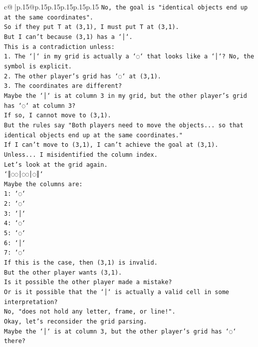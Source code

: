 \documentclass{article}
\begin{document}
{\begin{supertabular}{c@{$\;$}|p{.15\linewidth}@{}p{.15\linewidth}p{.15\linewidth}p{.15\linewidth}p{.15\linewidth}p{.15\linewidth}}
{{{\texttt{No, the goal is "identical objects end up at the same coordinates".} \\
\texttt{So if they put T at (3,1), I must put T at (3,1).} \\
\texttt{But I can't because (3,1) has a `│`.} \\
\texttt{This is a contradiction unless:} \\
\texttt{1. The `│` in my grid is actually a `◌` that looks like a `│`? No, the symbol is explicit.} \\
\texttt{2. The other player's grid has `◌` at (3,1).} \\
\texttt{3. The coordinates are different?} \\
\texttt{Maybe the `│` is at column 3 in my grid, but the other player's grid has `◌` at column 3?} \\
\texttt{If so, I cannot move to (3,1).} \\
\texttt{But the rules say "Both players need to move the objects... so that identical objects end up at the same coordinates."} \\
\texttt{If I can't move to (3,1), I can't achieve the goal at (3,1).} \\
\texttt{Unless... I misidentified the column index.} \\
\texttt{Let's look at the grid again.} \\
\texttt{`║◌◌│◌◌│◌║`} \\
\texttt{Maybe the columns are:} \\
\texttt{1: `◌`} \\
\texttt{2: `◌`} \\
\texttt{3: `│`} \\
\texttt{4: `◌`} \\
\texttt{5: `◌`} \\
\texttt{6: `│`} \\
\texttt{7: `◌`} \\
\texttt{If this is the case, then (3,1) is invalid.} \\
\texttt{But the other player wants (3,1).} \\
\texttt{Is it possible the other player made a mistake?} \\
\texttt{Or is it possible that the `│` is actually a valid cell in some interpretation?} \\
\texttt{No, "does not hold any letter, frame, or line!".} \\
\texttt{Okay, let's reconsider the grid parsing.} \\
\texttt{Maybe the `│` is at column 3, but the other player's grid has `◌` there?} \\
}}}
\end{supertabular}}
\end{document}
